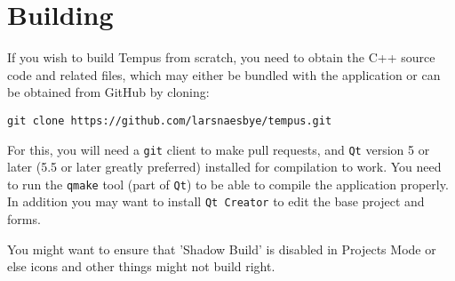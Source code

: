 \section{Building}

If you wish to build Tempus from scratch, you need to obtain the C++ source code and related files, which may either be bundled with the application or can be obtained from GitHub by cloning:

\texttt{git clone https://github.com/larsnaesbye/tempus.git}

For this, you will need a \texttt{git} client to make pull requests, and \texttt{Qt} version 5 or later (5.5 or later greatly preferred) installed for compilation to work. 
You need to run the \texttt{qmake} tool (part of \texttt{Qt}) to be able to compile the application properly. In addition you may want to install \texttt{Qt Creator} to edit the base project and forms.

You might want to ensure that 'Shadow Build' is disabled in Projects Mode or else icons and other things might not build right.
